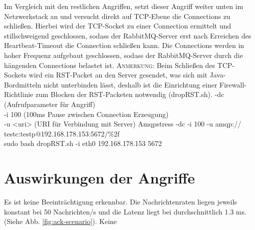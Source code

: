 \documentclass[	a4paper,
			11pt,
			oneside,
			parskip]{scrartcl}
\begin{document}
		{%
		 Im Vergleich mit den restlichen Angriffen, setzt dieser Angriff weiter unten im Netzwerkstack an und versucht direkt auf TCP-Ebene die Connections zu schließen. Hierbei wird der TCP-Socket zu einer 
		 Connection ermittelt und stillschweigend geschlossen, sodass der RabbitMQ-Server erst nach Erreichen des Heartbeat-Timeout die Connection schließen kann. Die Connections werden in hoher Frequenz aufgebaut
		 geschlossen, sodass der RabbitMQ-Server durch die hängenden Connections belastet ist. \medskip\newline
		 \textsc{Anmerkung:} Beim Schließen des TCP-Sockets wird ein RST-Packet an den Server gesendet, was sich mit Java-Bordmitteln nicht unterbinden lässt, deshalb ist die Einrichtung einer Firewall-Richtlinie zum
		 Blocken der RST-Packeten notwendig (dropRST.sh).
		}{%
		 -dc (Aufrufparameter für Angriff) \\
		 -i 100 (100ms Pause zwischen Connection Erzeugung) \\
		 -u <uri> (URI für Verbindung mit Server)
		}{%
		 Amqpstress -dc -i 100 -u amqp://\\\hspace*{3cm}testc:testp@192.168.178.153:5672/\%2f\\
		 sudo bash dropRST.sh -i eth0 192.168.178.153 5672
		}
	


%	
%
\clearpage
\section*{Auswirkungen der Angriffe}
	
		{%
		  \newline
		  \newline
		  \newline
		}{%
		 Es ist keine Beeinträchtigung erkennbar. Die Nachrichtenraten liegen jeweils konstant bei 50 Nachrichten/s und die Latenz liegt bei durchschnittlich 1.3 ms.
		 (Siehe Abb. \ref{fig:ack-scenario}).
		}{%
		 Keine
		}
		
\end{document}

